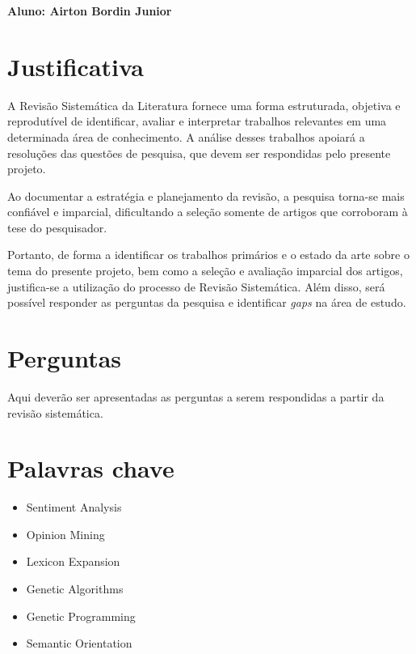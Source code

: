 \documentclass[a4paper,11pt]{article}
\begin{document}
\selectfont



\begin{framed}
\begin{center}
\textbf{Aluno: Airton Bordin Junior}
\end{center}


\end{framed}

\section{Justificativa}
A Revisão Sistemática da Literatura fornece uma forma estruturada, objetiva e reprodutível de identificar, avaliar e interpretar trabalhos relevantes em uma determinada área de conhecimento. A análise desses trabalhos apoiará a resoluções das questões de pesquisa, que devem ser respondidas pelo presente projeto.

Ao documentar a estratégia e planejamento da revisão, a pesquisa torna-se mais confiável e imparcial, dificultando a seleção somente de artigos que corroboram à tese do pesquisador. 

Portanto, de forma a identificar os trabalhos primários e o estado da arte sobre o tema do presente projeto, bem como a seleção e avaliação imparcial dos artigos, justifica-se a utilização do processo de Revisão Sistemática. Além disso, será possível responder as perguntas da pesquisa e identificar \emph{gaps} na área de estudo.

\section{Perguntas}
Aqui deverão ser apresentadas as perguntas a serem respondidas a partir da revisão sistemática.

\section{Palavras chave}
\begin{itemize}
	\item{Sentiment Analysis}
	\item{Opinion Mining}
	\item{Lexicon Expansion}
	\item{Genetic Algorithms}
	\item{Genetic Programming}
	\item{Semantic Orientation}
\end{itemize}
\end{document}
